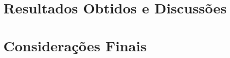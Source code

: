 \documentclass[
	12pt,				  %
	openright,		%
	a4paper,			%
	english,			%
	french,				%
	spanish,			%
	brazil,				%
]{abntex2}
\begin{document}
\chapter{Resultados Obtidos e Discussões}


\chapter{Considerações Finais}





\postextual





\begin{apendicesenv}

	\partapendices

\end{apendicesenv}



\begin{anexosenv}

\end{anexosenv}




\clearpage



\printindex
\end{document}
